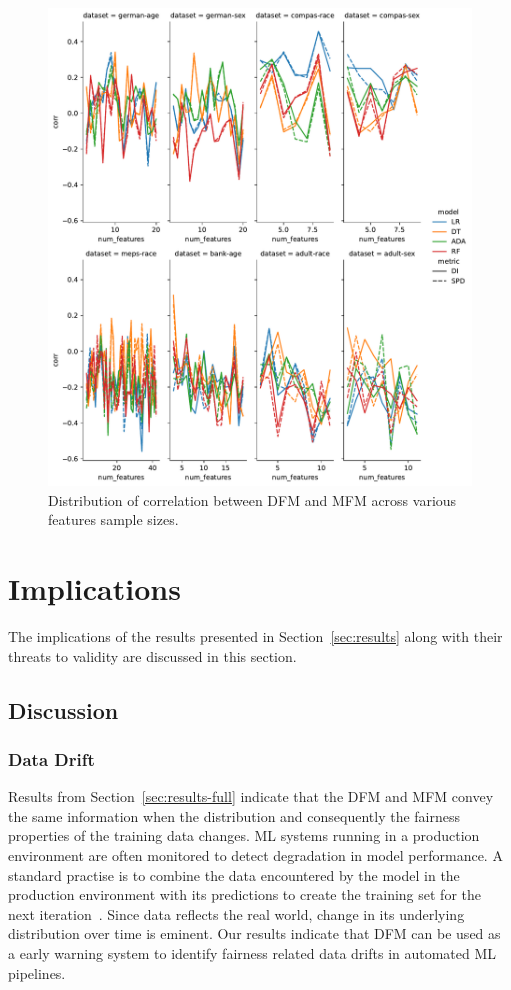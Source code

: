 \documentclass{article}
\begin{document}
\begin{figure}
  \centering
  \includegraphics[width=0.95\linewidth]{lineplot--num-features--corr.pdf}
  \caption{Distribution of correlation between DFM and MFM across
  various features sample sizes.}
  \label{fig:lineplot--num-features--corr}
\end{figure}

\section{Implications}\label{sec:implications}
The implications of the results presented in Section \ref{sec:results}
along with their threats to validity are discussed in this section.

\subsection{Discussion}\label{sec:discuss}
\subsubsection{Data Drift}\label{sec:discuss-data-drift}

Results from Section \ref{sec:results-full} indicate that the DFM and
MFM convey the same information when the distribution and consequently
the fairness properties of the training data changes. ML systems
running in a production environment are often monitored to detect
degradation in model performance. A standard practise is to combine
the data encountered by the model in the production environment with
its predictions to create the training set for the next
iteration \cite{biessmann2021automated}. Since data reflects the real
world, change in its underlying distribution over time is eminent. Our
results indicate that DFM can be used as a early warning system to
identify fairness related data drifts in automated ML pipelines.
\end{document}
